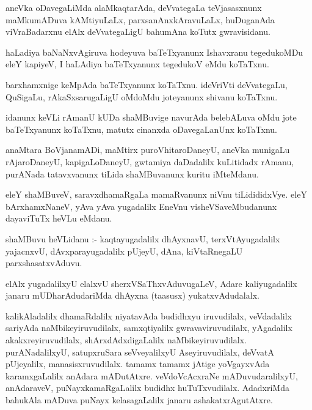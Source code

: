 \documentclass{article}
\begin{document}
\begin{mn}
aneVka  oDavegaLiMda  alaMkaqtarAda,  deVvategaLa  teVjasasxnunx  maMkumADuva  kAMtiyuLaLx,  
parxsanAnxkAravuLaLx,  huDuganAda  viVraBadarxnu  elAlx  deVvategaLigU  bahumAna  koTutx  gwravisidanu.
\end{mn}

\begin{mn}
haLadiya  baNaNxvAgiruva  hodeyuva  baTeTxyanunx  Ishavxranu  tegedukoMDu  eleY  kapiyeV,  I  haLAdiya  
baTeTxyanunx  tegedukoV  eMdu  koTaTxnu.
\end{mn}

\begin{mn}
barxhamxnige  keMpAda  baTeTxyanunx  koTaTxnu.  ideVriVti  deVvategaLu,  QuSigaLu,  rAkaSxsarugaLigU  
oMdoMdu  joteyanunx  shivanu  koTaTxnu.
\end{mn}

\begin{mn}
idanunx  keVLi  rAmanU  kUDa  shaMBuvige  navurAda  belebALuva  oMdu jote  baTeTxyanunx  koTaTxnu,  
matutx  cinanxda  oDavegaLanUnx  koTaTxnu.  
\end{mn}

\begin{mn}
anaMtara  BoVjanamADi,  maMtirx  puroVhitaroDaneyU,  aneVka  munigaLu  rAjaroDaneyU,  kapigaLoDaneyU,  
gwtamiya  daDadalilx  kuLitidadx  rAmanu,  purANada  tatavxvanunx  tiLida  shaMBuvanunx  kuritu  iMteMdanu.
\end{mn}

\begin{mn}
eleY  shaMBuveV,  saravxdhamaRgaLa  mamaRvanunx  niVnu  tiLidididxVye.  eleY  bArxhamxNaneV,  yAva  yAva  
yugadalilx  EneVnu  visheVSaveMbudanunx   dayaviTuTx  heVLu  eMdanu.
\end{mn}

\begin{mn}
shaMBuvu  heVLidanu :- kaqtayugadalilx  dhAyxnavU,  terxVtAyugadalilx  yajacnxvU,  dAvxparayugadalilx  
pUjeyU,  dAna,  kiVtaRnegaLU  parxshasatxvAduvu.
\end{mn}

\begin{mn}
elAlx  yugadalilxyU  elalxvU  sherxVSaThxvAduvugaLeV,  Adare  kaliyugadalilx  janaru  mUDharAdudariMda  
dhAyxna (taasusx) yukatxvAdudalalx.
\end{mn}

\begin{mn}
kalikAladalilx  dhamaRdalilx  niyatavAda  budidhxyu  iruvudilalx,  veVdadalilx  sariyAda  naMbikeyiruvudilalx,  
samxqtiyalilx  gwravaviruvudilalx,  yAgadalilx  akakxreyiruvudilalx,  shArxdAdxdigaLalilx  naMbikeyiruvudilalx.  
purANadalilxyU,  satupxruSara  seVveyalilxyU  Aseyiruvudilalx,  deVvatA pUjeyalilx,  manasisxruvudilalx.  
tamamx  tamamx  jAtige  yoVgayxvAda  karamxgaLalilx  anAdara mADutAtxre.  veVdoVcAcxraNe   mADuvudaralilxyU,  
anAdaraveV,  puNayxkamaRgaLalilx  budidhx  huTuTxvudilalx.  AdadxriMda  bahukAla  mADuva  puNayx  kelasagaLalilx  
janaru  ashakatxrAgutAtxre.
\end{mn}
\end{document}
